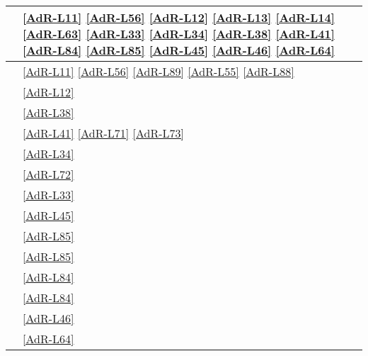 \begin{longtable}{|m{12cm}|>{\centering}m{2cm}|}
	\hline \coderef{Framework::View::GUI::GUI} &\ref{AdR-L11} \linebreak \ref{AdR-L56} \linebreak \ref{AdR-L12} \linebreak  \ref{AdR-L13} \linebreak \ref{AdR-L14} \linebreak \ref{AdR-L63} \linebreak \ref{AdR-L33} \linebreak \ref{AdR-L34} \linebreak \ref{AdR-L38} \linebreak \ref{AdR-L41} \linebreak \ref{AdR-L84} \linebreak \ref{AdR-L85} \linebreak \ref{AdR-L45} \linebreak \ref{AdR-L46} \linebreak \ref{AdR-L64} \tabularnewline
	\hline \coderef{Framework::View::GUIContainer} & \ref{AdR-L11} \linebreak \ref{AdR-L56} \linebreak \ref{AdR-L89} \linebreak \ref{AdR-L55} \linebreak \ref{AdR-L88} \tabularnewline
	\hline \coderef{Framework::View::GUI::Label} & \ref{AdR-L12} \tabularnewline
	\hline \coderef{Framework::View::GUI::InputFile} & \ref{AdR-L38} \tabularnewline
	\hline \coderef{Framework::View::GUI::Button} & \ref{AdR-L41} \linebreak \ref{AdR-L71} \linebreak \ref{AdR-L73} \tabularnewline
	\hline \coderef{Framework::View::GUI::TextEdit} & \ref{AdR-L34} \tabularnewline
	\hline \coderef{Framework::View::GUI::InputText} & \ref{AdR-L72} \tabularnewline
	\hline \coderef{Framework::View::GUI::TextView} & \ref{AdR-L33} \tabularnewline
	\hline \coderef{Framework::View::GUI::Image} & \ref{AdR-L45} \tabularnewline
	\hline \coderef{Framework::View::GUI::CheckBox} & \ref{AdR-L85} \tabularnewline
	\hline \coderef{Framework::View::GUI::CheckBoxGroup} & \ref{AdR-L85} \tabularnewline
	\hline \coderef{Framework::View::GUI::RadioButton} & \ref{AdR-L84} \tabularnewline
	\hline \coderef{Framework::View::GUI::RadioButtonGroup} & \ref{AdR-L84} \tabularnewline
	\hline \coderef{Framework::View::GUI::PieChart} & \ref{AdR-L46} \tabularnewline
	\hline \coderef{Framework::View::GUI::BarChart} & \ref{AdR-L64} \tabularnewline
	

\end{longtable}
